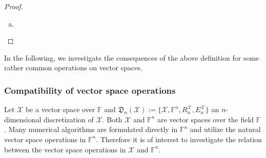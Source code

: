 \documentclass[a4paper]{paper}
\newcommand{\Discr}{\mathfrak{D}}
\newcommand{\VecSpace}[1]{\mathscr{#1}}
\newcommand{\Field}{\mathbb{F}}
\newcommand*{\EXT}[2]{\ensuremath{E_{#1}^{#2}}}
\newcommand*{\REST}[2]{\ensuremath{R_{#1}^{#2}}}
\newcommand*{\RnX}{\ensuremath{\REST{n}{\VecSpace{X}}}}
\newcommand*{\EnX}{\ensuremath{\EXT{n}{\VecSpace{X}}}}
\begin{document}
\begin{proof}
\begin{enumerate}[a)]
  \item 
 \end{enumerate}
\end{proof}


In the following, we investigate the consequences of the above definition for some rather common operations
on vector spaces.





\subsubsection{Compatibility of vector space operations}
Let $\VecSpace{X}$ be a vector space over $\Field$ and 
$\Discr_{n}(\VecSpace{X}):=\{\VecSpace{X},\Field^{n},\RnX,\EnX\}$ an $n$-dimensional discretization of 
$\VecSpace{X}$.  Both $\VecSpace{X}$ and $\Field^{n}$ are vector spaces over the field $\Field$. 
Many numerical algorithms are 
formulated directly in $\Field^{n}$ and utilize the natural vector space operations in $\Field^{n}$. Therefore it is of
interest to investigate the relation between the vector space operations in $\VecSpace{X}$ and $\Field^{n}$.
\end{document}
